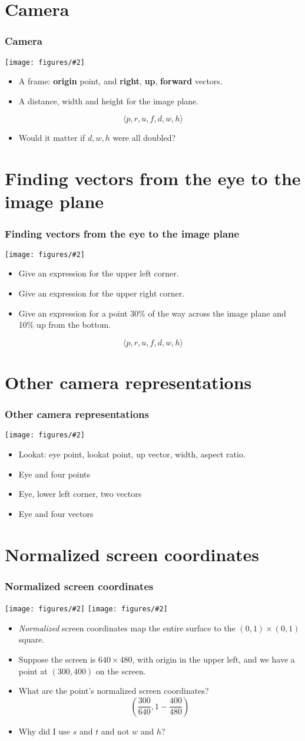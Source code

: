 \documentclass[slidestop,xcolor=pst]{beamer}
\newcommand{\mygraph}[2]{\texttt{[image: figures/\#2]}}
\newcommand{\sect}[1]{
\section{#1}
\begin{frame}[fragile]\frametitle{#1}
}
\begin{document}
\sect{Camera}
\mygraph{.5}{camera01.png}
\begin{minipage}[b]{2.25in}
\begin{itemize}
\item A frame: {\bf origin} point, and {\bf right}, {\bf up}, {\bf forward} vectors.
\item A distance, width and height for the image plane.
\end{itemize}
\[ \langle p,r,u,f,d,w,h \rangle \]
\begin{itemize}
\item Would it matter if $d,w,h$ were all doubled?
\end{itemize}
\end{minipage}
\end{frame}

\sect{Finding vectors from the eye to the image plane}
\mygraph{.5}{mapping02.png}
\begin{minipage}[b]{2.25in}
\begin{itemize}
\item Give an expression for the upper left corner.
  \item Give an expression for the upper right corner.
\item Give an expression for a point 30\% of the way across the image
  plane and 10\% up from the bottom.
\end{itemize}
\end{minipage}

\[ \langle p,r,u,f,d,w,h \rangle \]
\end{frame}


\sect{Other camera representations}
\mygraph{.5}{camera01.png}
\begin{minipage}[b]{2.25in}
\begin{itemize}
\item Lookat:  eye point, lookat point, up vector, width, aspect ratio.
\item Eye and four points
\item Eye, lower left corner, two vectors
\item Eye and four vectors
\end{itemize}
\end{minipage}
\end{frame}


\sect{Normalized screen coordinates}
\mygraph{.35}{mapping01.png}\hfill
\mygraph{.35}{normalsquare.png}
\begin{itemize}
\item {\em Normalized} screen coordinates map the entire surface to
  the $(0,1)\times(0,1)$ square.
\item Suppose the screen is $640\times480$, with origin in the upper
  left, and we have a point at $(300,400)$ on the screen.
\item What are the point's normalized screen coordinates? \pause
  \[
  \left(\frac{300}{640}, 1-\frac{400}{480}\right)
  \]
  \pause
  \item Why did I use $s$ and $t$ and not $w$ and $h$?
\end{itemize}
\end{frame}
\end{document}
